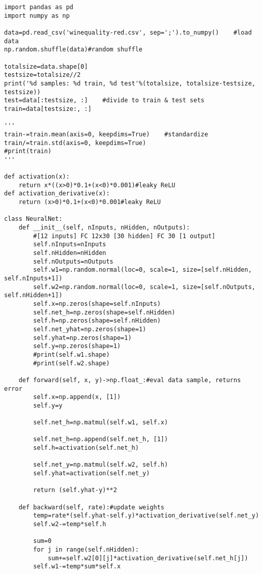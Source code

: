 \documentclass[10pt]{article}
\begin{document}
\begin{tiny}
\begin{verbatim}
import pandas as pd
import numpy as np

data=pd.read_csv('winequality-red.csv', sep=';').to_numpy()    #load data
np.random.shuffle(data)#random shuffle

totalsize=data.shape[0]
testsize=totalsize//2
print('%d samples: %d train, %d test'%(totalsize, totalsize-testsize, testsize))
test=data[:testsize, :]    #divide to train & test sets
train=data[testsize:, :]

'''
train-=train.mean(axis=0, keepdims=True)    #standardize
train/=train.std(axis=0, keepdims=True)
#print(train)
'''

def activation(x):
    return x*((x>0)*0.1+(x<0)*0.001)#leaky ReLU
def activation_derivative(x):
    return (x>0)*0.1+(x<0)*0.001#leaky ReLU

class NeuralNet:
    def __init__(self, nInputs, nHidden, nOutputs):
        #[12 inputs] FC 12x30 [30 hidden] FC 30 [1 output]
        self.nInputs=nInputs
        self.nHidden=nHidden
        self.nOutputs=nOutputs
        self.w1=np.random.normal(loc=0, scale=1, size=[self.nHidden, self.nInputs+1])
        self.w2=np.random.normal(loc=0, scale=1, size=[self.nOutputs, self.nHidden+1])
        self.x=np.zeros(shape=self.nInputs)
        self.net_h=np.zeros(shape=self.nHidden)
        self.h=np.zeros(shape=self.nHidden)
        self.net_yhat=np.zeros(shape=1)
        self.yhat=np.zeros(shape=1)
        self.y=np.zeros(shape=1)
        #print(self.w1.shape)
        #print(self.w2.shape)
    
    def forward(self, x, y)->np.float_:#eval data sample, returns error
        self.x=np.append(x, [1])
        self.y=y
        
        self.net_h=np.matmul(self.w1, self.x)
        
        self.net_h=np.append(self.net_h, [1])
        self.h=activation(self.net_h)
        
        self.net_y=np.matmul(self.w2, self.h)
        self.yhat=activation(self.net_y)
        
        return (self.yhat-y)**2
    
    def backward(self, rate):#update weights
        temp=rate*(self.yhat-self.y)*activation_derivative(self.net_y)
        self.w2-=temp*self.h
        
        sum=0
        for j in range(self.nHidden):
            sum+=self.w2[0][j]*activation_derivative(self.net_h[j])
        self.w1-=temp*sum*self.x



\end{verbatim}
\end{tiny}
\end{document}
